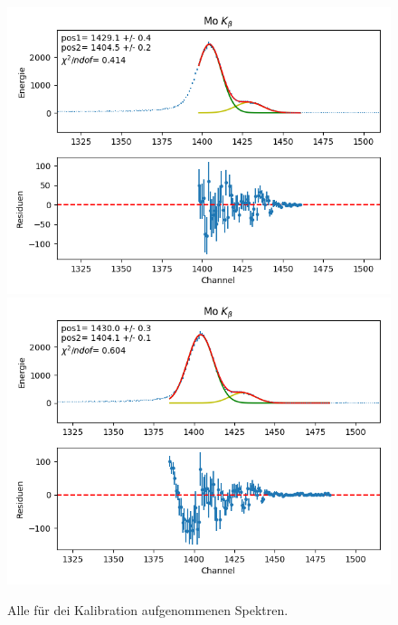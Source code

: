 \documentclass[12pt,a4paper]{article}
\begin{document}
\begin{figure}[H]
\centering
\includegraphics[scale=0.8]{Bilder/alpha/mo_beta_1.png}
\includegraphics[scale=0.8]{Bilder/alpha/mo_beta_2.png}
\caption{Alle für dei Kalibration aufgenommenen Spektren.}
\label{fig:kal_alles}
\end{figure}
\end{document}
